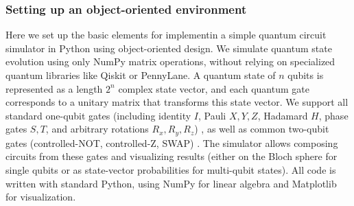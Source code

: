 \documentclass{beamer}
\begin{document}
\begin{frame}
\frametitle{Setting up an object-oriented environment}

Here we set up the basic elements for implementin a simple quantum circuit simulator in Python
using object-oriented design. We simulate quantum state evolution
using only NumPy matrix operations, without relying on specialized
quantum libraries like Qiskit or PennyLane. A quantum state of $n$
qubits is represented as a length $2^n$ complex state vector, and each
quantum gate corresponds to a unitary matrix that transforms this
state vector. We support all standard one-qubit gates (including
identity $I$, Pauli $X,Y,Z$, Hadamard $H$, phase gates $S,T$, and
arbitrary rotations $R_x, R_y, R_z$) , as well as common two-qubit
gates (controlled-NOT, controlled-Z, SWAP) . The simulator allows
composing circuits from these gates and visualizing results (either on
the Bloch sphere for single qubits or as state-vector probabilities
for multi-qubit states). All code is written with standard Python,
using NumPy for linear algebra and Matplotlib for visualization.
\end{frame}
\end{document}
